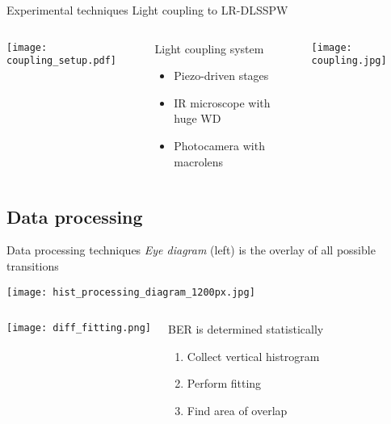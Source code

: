   \begin{frame}{Experimental techniques}
               {Light coupling to LR-DLSSPW}
    \begin{columns}
        \texttt{[image: coupling\_setup.pdf]}
        \begin{block}{Light coupling system}
          \begin{itemize}
            \item Piezo-driven stages
            \item IR microscope with huge WD
            \item Photocamera with macrolens
          \end{itemize}
        \end{block}
        \vspace{0mm}
        \begin{center}
          \texttt{[image: coupling.jpg]}
        \end{center}
    \end{columns}
    \begin{center}
    \end{center}
  \end{frame}


  \subsection{Data processing} %
  \label{sub:data_processing}
  
  \begin{frame}{Data processing techniques}
    \emph{Eye diagram} (left) is the overlay of all possible transitions
    \vspace{-1mm}
    \begin{center}
      \texttt{[image: hist\_processing\_diagram\_1200px.jpg]}
    \end{center}
    \begin{columns}
        \texttt{[image: diff\_fitting.png]}\hspace{-4mm}
        \vspace{-3mm}
        \begin{block}{BER is determined statistically}
          \begin{enumerate}
            \item Collect vertical histrogram
            \item Perform fitting
            \item Find area of overlap
          \end{enumerate}
        \end{block}
    \end{columns}
  \end{frame}



